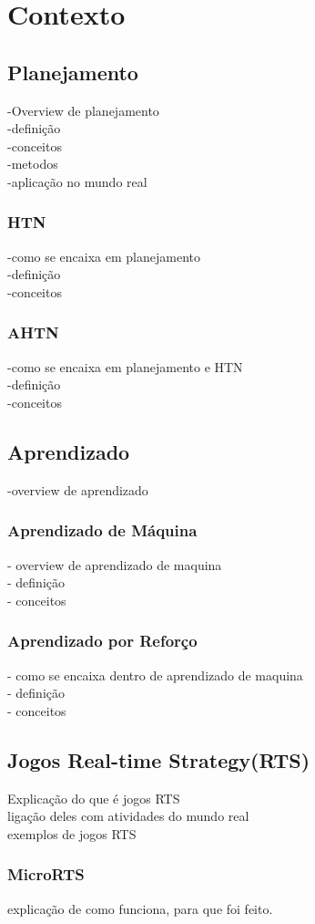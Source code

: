 \chapter{\label{chap:conte}Contexto}

\cite{meneguzzi2015planning}
\cite{ontanon2015adversarial}
\cite{ontanon2012experiments}
\cite{intelligence2003modern}
\cite{buro2003real}
\cite{hogg2010learning} 

\section{Planejamento} 
-Overview de planejamento \\
-definição \\
-conceitos \\
-metodos \\
-aplicação no mundo real

\subsection{HTN} 
-como se encaixa em planejamento \\ 
-definição \\
-conceitos \\

\subsection{AHTN} 
-como se encaixa em planejamento e HTN \\
-definição \\
-conceitos

\section{Aprendizado} 
-overview de aprendizado

\subsection{Aprendizado de Máquina} 
- overview de aprendizado de maquina \\
- definição \\
- conceitos
\subsection{Aprendizado por Reforço} 
- como se encaixa dentro de aprendizado de maquina \\
- definição \\
- conceitos

\section{Jogos Real-time Strategy(RTS)} 
Explicação do que é jogos RTS \\
ligação deles com atividades do mundo real \\
exemplos de jogos RTS 

\subsection{MicroRTS} 
explicação de como funciona, para que foi feito. 
